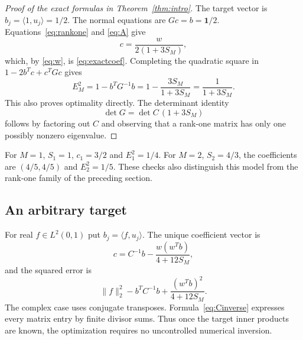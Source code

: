 \documentclass[11pt]{amsart}
\theoremstyle{definition}
\newcommand{\one}{\boldsymbol 1}\newcommand{\diag}{\operatorname{diag}}
\begin{document}
\begin{proof}[Proof of the exact formulas in Theorem~\ref{thm:intro}]
The target vector is $b_j=\langle1,u_j\rangle=1/2$. The normal
equations are $Gc=b=\one/2$. Equations~\eqref{eq:rankone} and
\eqref{eq:A} give
\[
 c=\frac{w}{2(1+3S_M)},
\]
which, by \eqref{eq:w}, is \eqref{eq:exactcoef}. Completing the
quadratic square in
$1-2b^Tc+c^TGc$ gives
\[
 E_M^2=1-b^TG^{-1}b
   =1-\frac{3S_M}{1+3S_M}=\frac1{1+3S_M}.
\]
This also proves optimality directly. The determinant identity
\[
 \det G=\det C\,(1+3S_M)
\]
follows by factoring out $C$ and observing that a rank-one matrix
has only one possibly nonzero eigenvalue.
\end{proof}

For $M=1$, $S_1=1$, $c_1=3/2$ and $E_1^2=1/4$.
For $M=2$, $S_2=4/3$, the coefficients are $(4/5,4/5)$ and
$E_2^2=1/5$. These checks also distinguish this model from the
rank-one family of the preceding section.

\subsection{An arbitrary target}
For real $f\in L^2(0,1)$ put $b_j=\langle f,u_j\rangle$. The unique
coefficient vector is
\[
 c=C^{-1}b-\frac{w(w^Tb)}{4+12S_M},
\]
and the squared error is
\[
 \|f\|_2^2-b^TC^{-1}b+\frac{(w^Tb)^2}{4+12S_M}.
\]
The complex case uses conjugate transposes. Formula~\eqref{eq:Cinverse}
expresses every matrix entry by finite divisor sums. Thus once the
target inner products are known, the optimization requires no
uncontrolled numerical inversion.
\end{document}

